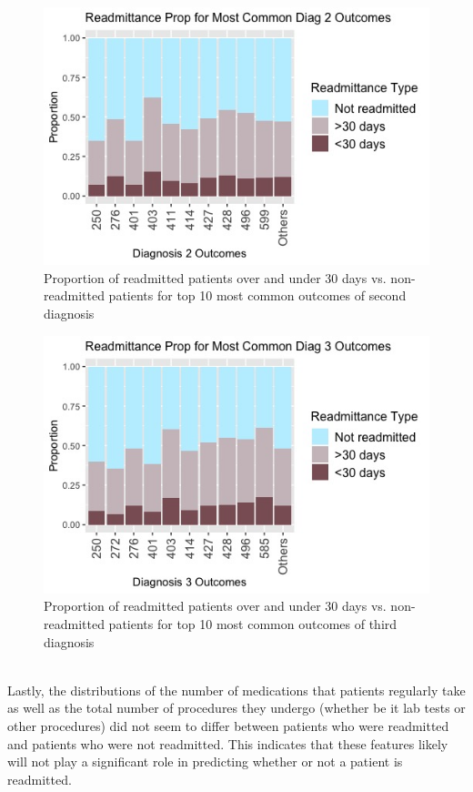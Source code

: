 \documentclass[letterpaper, 10 pt, conference]{ieeeconf}  %
\begin{document}
\begin{figure}[!hbt]
\centering
\includegraphics[width=1\columnwidth]{Rplot02.png}
\caption{Proportion of readmitted patients over and under 30 days vs. non-readmitted patients for top 10 most common outcomes of second diagnosis}
\label{diag2}
\end{figure}

\begin{figure}[!hbt]
\centering
\includegraphics[width=1\columnwidth]{Rplot03.png}
\caption{Proportion of readmitted patients over and under 30 days vs. non-readmitted patients for top 10 most common outcomes of third diagnosis}
\label{diag3}
\end{figure}\\

Lastly, the distributions of the number of medications that patients regularly take as well as the total number of procedures they undergo (whether be it lab tests or other procedures) did not seem to differ between patients who were readmitted and patients who were not readmitted. This indicates that these features likely will not play a significant role in predicting whether or not a patient is readmitted. 
\end{document}
